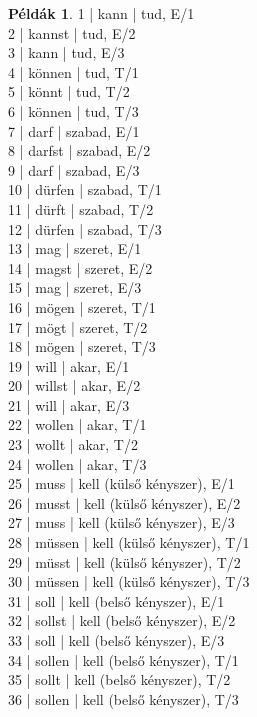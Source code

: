 \documentclass{article}
\theoremstyle{definition}
\newtheorem*{exmp}{Példák}
\begin{document}
\begin{exmp}
1 | kann | tud, E/1\\
2 | kannst | tud, E/2\\
3 | kann | tud, E/3\\
4 | können | tud, T/1\\
5 | könnt | tud, T/2\\
6 | können | tud, T/3\\
7 | darf | szabad, E/1\\
8 | darfst | szabad, E/2\\
9 | darf | szabad, E/3\\
10 | dürfen | szabad, T/1\\
11 | dürft | szabad, T/2\\
12 | dürfen | szabad, T/3\\
13 | mag | szeret, E/1\\
14 | magst | szeret, E/2\\
15 | mag | szeret, E/3\\
16 | mögen | szeret, T/1\\
17 | mögt | szeret, T/2\\
18 | mögen | szeret, T/3\\
19 | will | akar, E/1\\
20 | willst | akar, E/2\\
21 | will | akar, E/3\\
22 | wollen | akar, T/1\\
23 | wollt | akar, T/2\\
24 | wollen | akar, T/3\\
25 | muss | kell (külső kényszer), E/1\\
26 | musst | kell (külső kényszer), E/2\\
27 | muss | kell (külső kényszer), E/3\\
28 | müssen | kell (külső kényszer), T/1\\
29 | müsst | kell (külső kényszer), T/2\\
30 | müssen | kell (külső kényszer), T/3\\
31 | soll | kell (belső kényszer), E/1\\
32 | sollst | kell (belső kényszer), E/2\\
33 | soll | kell (belső kényszer), E/3\\
34 | sollen | kell (belső kényszer), T/1\\
35 | sollt | kell (belső kényszer), T/2\\
36 | sollen | kell (belső kényszer), T/3\\
\end{exmp}
\end{document}
